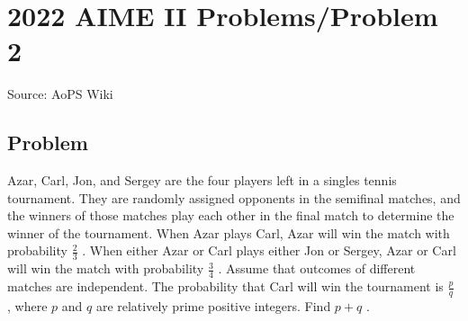 \documentclass[12pt]{article}
\begin{document}
\section*{{2022 AIME II Problems/Problem 2}}
Source: AoPS Wiki

\subsection*{Problem}
Azar, Carl, Jon, and Sergey are the four players left in a singles tennis tournament. They are randomly assigned opponents in the semifinal matches, and the winners of those matches play each other in the final match to determine the winner of the tournament. When Azar plays Carl, Azar will win the match with probability $\frac23$ . When either Azar or Carl plays either Jon or Sergey, Azar or Carl will win the match with probability $\frac34$ . Assume that outcomes of different matches are independent. The probability that Carl will win the tournament is $\frac{p}{q}$ , where $p$ and $q$ are relatively prime positive integers. Find $p+q$ .
\end{document}
